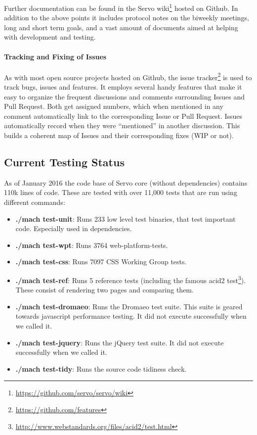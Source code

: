 \documentclass{scrartcl}
\begin{document}
Further documentation can be found in the Servo wiki\footnote{\url{https://github.com/servo/servo/wiki}} hosted on Github. In addition to the above points it includes protocol notes on the biweekly meetings, long and short term goals, and a vast amount of documents aimed at helping with development and testing.

\paragraph{Tracking and Fixing of Issues}
As with most open source projects hosted on Github, the issue tracker\footnote{\url{https://github.com/features}} is used to track bugs, issues and features. It employs several handy features that make it easy to organize the frequent discussions and comments surrounding Issues and Pull Request. Both get assigned numbers, which when mentioned in any comment automatically link to the corresponding Issue or Pull Request. Issues automatically record when they were ``mentioned'' in another discussion. This builds a coherent map of Issues and their corresponding fixes (WIP or not).

\subsection{Current Testing Status} \label{test_status}

As of January 2016 the code base of Servo core (without dependencies) contains 110k lines of code. These are tested with over 11,000 tests that are run using different commands:
\begin{itemize}
    \item \textbf{./mach test-unit}: Runs 233 low level test binaries, that test important code. Especially used in dependencies.
    \item \textbf{./mach test-wpt}: Runs 3764 web-platform-tests. 
    \item \textbf{./mach test-css}: Runs 7097 CSS Working Group tests.
    \item \textbf{./mach test-ref}: Runs 5 reference tests (including the famous acid2 test\footnote{\url{http://www.webstandards.org/files/acid2/test.html}}). These consist of rendering two pages and comparing them.
    \item \textbf{./mach test-dromaeo}: Runs the Dromaeo test suite. This suite is geared towards javascript performance testing. It did not execute successfully when we called it.
    \item \textbf{./mach test-jquery}: Runs the jQuery test suite. It did not execute successfully when we called it.
    \item \textbf{./mach test-tidy}: Runs the source code tidiness check.
\end{itemize}
\end{document}
